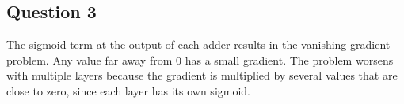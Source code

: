 \documentclass[12pt]{article} %
\begin{document}
\subsection{Question 3}
The sigmoid term at the output of each adder results in the vanishing gradient problem. Any value far away from 0 has a small gradient. The problem worsens with multiple layers because the gradient is multiplied by several values that are close to zero, since each layer has its own sigmoid.
\end{document}
